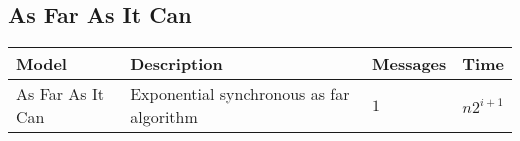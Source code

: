 \subsection{As Far As It Can}
\begin{table}[h]
\begin{tabular}{llll}
			\textbf{Model}		& \textbf{Description}						& \textbf{Messages}						& \textbf{Time} \\
	\hline 	As Far As It Can 	& Exponential synchronous as far algorithm	& $1$									& $n2^{i + 1}$ \\
\end{tabular}
\end{table}